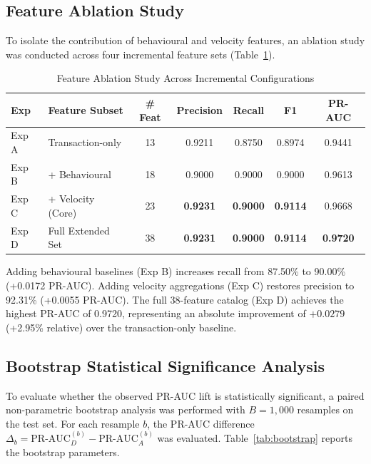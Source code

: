 \documentclass[conference]{IEEEtran}
\begin{document}
\subsection{Feature Ablation Study}
To isolate the contribution of behavioural and velocity features, an ablation study was conducted across four incremental feature sets (Table~\ref{tab:ablation_study}).

\begin{table}[t]
\centering
\caption{Feature Ablation Study Across Incremental Configurations}
\label{tab:ablation_study}
\small
\begin{tabular}{llccccc}
\toprule
\textbf{Exp} & \textbf{Feature Subset} & \textbf{\# Feat} & \textbf{Precision} & \textbf{Recall} & \textbf{F1} & \textbf{PR-AUC} \\
\midrule
Exp A & Transaction-only & 13 & 0.9211 & 0.8750 & 0.8974 & 0.9441 \\
Exp B & + Behavioural & 18 & 0.9000 & 0.9000 & 0.9000 & 0.9613 \\
Exp C & + Velocity (Core) & 23 & \textbf{0.9231} & \textbf{0.9000} & \textbf{0.9114} & 0.9668 \\
Exp D & Full Extended Set & 38 & \textbf{0.9231} & \textbf{0.9000} & \textbf{0.9114} & \textbf{0.9720} \\
\bottomrule
\end{tabular}
\end{table}

Adding behavioural baselines (Exp B) increases recall from 87.50\% to 90.00\% (+0.0172 PR-AUC). Adding velocity aggregations (Exp C) restores precision to 92.31\% (+0.0055 PR-AUC). The full 38-feature catalog (Exp D) achieves the highest PR-AUC of 0.9720, representing an absolute improvement of $+0.0279$ (+2.95\% relative) over the transaction-only baseline.

\subsection{Bootstrap Statistical Significance Analysis}
To evaluate whether the observed PR-AUC lift is statistically significant, a paired non-parametric bootstrap analysis was performed with $B = 1,000$ resamples on the test set. For each resample $b$, the PR-AUC difference $\Delta_b = \text{PR-AUC}_D^{(b)} - \text{PR-AUC}_A^{(b)}$ was evaluated. Table~\ref{tab:bootstrap} reports the bootstrap parameters.
\end{document}
